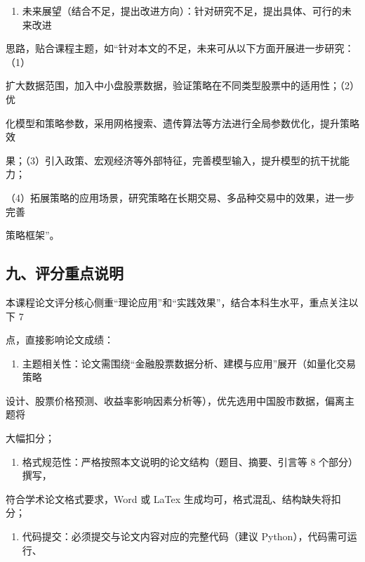 \documentclass[
]{article}
\providecommand{\tightlist}{%
  \setlength{\itemsep}{0pt}\setlength{\parskip}{0pt}}
\begin{document}
\begin{enumerate}
\def\labelenumi{\arabic{enumi}.}
\setcounter{enumi}{3}
\tightlist
\item
  未来展望（结合不足，提出改进方向）：针对研究不足，提出具体、可行的未来改进
\end{enumerate}

思路，贴合课程主题，如``针对本文的不足，未来可从以下方面开展进一步研究：（1）

扩大数据范围，加入中小盘股票数据，验证策略在不同类型股票中的适用性；（2）优

化模型和策略参数，采用网格搜索、遗传算法等方法进行全局参数优化，提升策略效

果；（3）引入政策、宏观经济等外部特征，完善模型输入，提升模型的抗干扰能力；

（4）拓展策略的应用场景，研究策略在长期交易、多品种交易中的效果，进一步完善

策略框架''。

\hypertarget{ux4e5dux8bc4ux5206ux91cdux70b9ux8bf4ux660e}{%
\subsection{\texorpdfstring{\textbf{九、评分重点说明}}{九、评分重点说明}}\label{ux4e5dux8bc4ux5206ux91cdux70b9ux8bf4ux660e}}

本课程论文评分核心侧重``理论应用''和``实践效果''，结合本科生水平，重点关注以下
7

点，直接影响论文成绩：

\begin{enumerate}
\def\labelenumi{\arabic{enumi}.}
\tightlist
\item
  主题相关性：论文需围绕``金融股票数据分析、建模与应用''展开（如量化交易策略
\end{enumerate}

设计、股票价格预测、收益率影响因素分析等），优先选用中国股市数据，偏离主题将

大幅扣分；

\begin{enumerate}
\def\labelenumi{\arabic{enumi}.}
\setcounter{enumi}{1}
\tightlist
\item
  格式规范性：严格按照本文说明的论文结构（题目、摘要、引言等 8
  个部分）撰写，
\end{enumerate}

符合学术论文格式要求，Word 或 LaTex 生成均可，格式混乱、结构缺失将扣分；

\begin{enumerate}
\def\labelenumi{\arabic{enumi}.}
\setcounter{enumi}{2}
\tightlist
\item
  代码提交：必须提交与论文内容对应的完整代码（建议
  Python），代码需可运行、
\end{enumerate}
\end{document}
